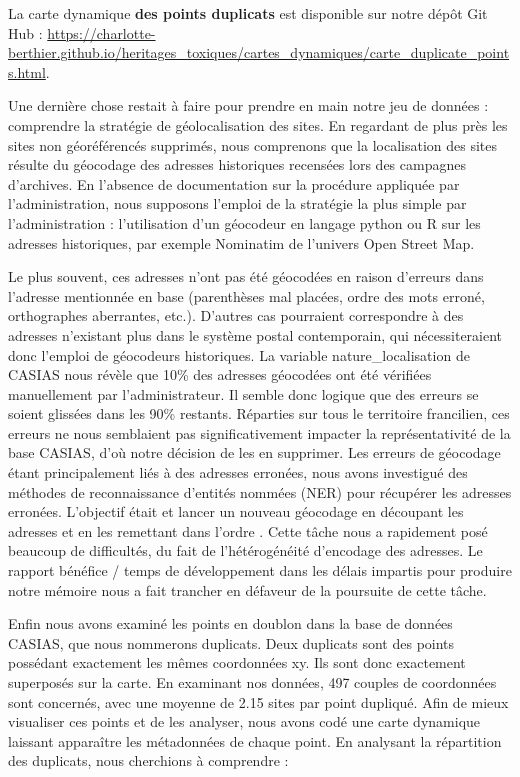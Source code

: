\documentclass[a4paper,twoside,12pt]{book}
\begin{document}
\begin{tcolorbox}[colback=gray!5!white,colframe=gray!20!white]
La carte dynamique \textbf{des points duplicats} est disponible sur notre dépôt Git Hub : \url{https://charlotte-berthier.github.io/heritages_toxiques/cartes_dynamiques/carte_duplicate_points.html}.
\end{tcolorbox}

Une dernière chose restait à faire pour prendre en main notre jeu de données : comprendre la stratégie de géolocalisation des sites. En regardant de plus près les sites non géoréférencés supprimés, nous comprenons que la localisation des sites résulte du géocodage des adresses historiques recensées lors des campagnes d’archives. En l'absence de documentation sur la procédure appliquée par l'administration, nous supposons l'emploi de la stratégie la plus simple par l'administration : l'utilisation d'un géocodeur en langage python ou R sur les adresses historiques, par exemple Nominatim de l'univers Open Street Map. 

Le plus souvent, ces adresses n'ont pas été géocodées en raison d'erreurs dans l'adresse mentionnée en base (parenthèses mal placées, ordre des mots erroné, orthographes aberrantes, etc.). D'autres cas pourraient correspondre à des adresses n'existant plus dans le système postal contemporain, qui nécessiteraient donc l'emploi de géocodeurs historiques. La variable \og{} nature\_localisation \fg{} de CASIAS nous révèle que 10\% des adresses géocodées ont été vérifiées manuellement par l'administrateur. Il semble donc logique que des erreurs se soient glissées dans les 90\% restants. Réparties sur tous le territoire francilien, ces erreurs ne nous semblaient pas significativement impacter la représentativité de la base CASIAS, d'où notre décision de les en supprimer. Les erreurs de géocodage étant principalement liés à des adresses erronées, nous avons investigué des méthodes de reconnaissance d'entités nommées (NER) pour récupérer les adresses erronées. L'objectif était et lancer un nouveau géocodage en découpant les adresses et en les remettant dans l'ordre . Cette tâche nous a rapidement posé beaucoup de difficultés, du fait de l'hétérogénéité d'encodage des adresses. Le rapport bénéfice / temps de développement dans les délais impartis pour produire notre mémoire nous a fait trancher en défaveur de la poursuite de cette tâche. 

Enfin nous avons examiné les points en doublon dans la base de données CASIAS, que nous nommerons duplicats. Deux duplicats sont des points possédant exactement les mêmes coordonnées xy. Ils sont donc exactement superposés sur la carte. En examinant nos données, 497 couples de coordonnées sont concernés, avec une moyenne de 2.15 sites par point dupliqué. Afin de mieux visualiser ces points et de les analyser, nous avons codé une carte dynamique laissant apparaître les métadonnées de chaque point. En analysant la répartition des duplicats, nous cherchions à comprendre : 
\end{document}
